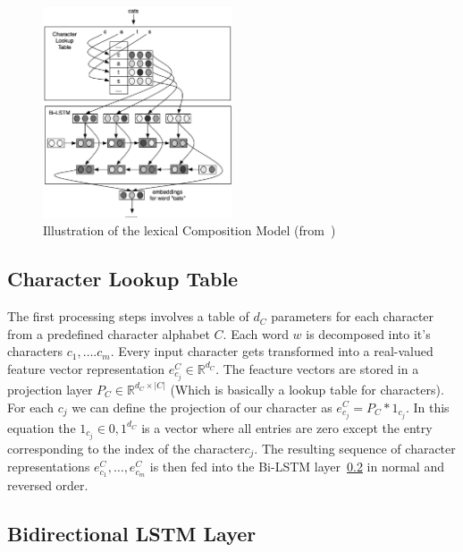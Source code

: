 \begin{figure}
  \begin{center}
    \includegraphics[width=0.5\textwidth]{./img/bi-lstm-emeddings}
  \end{center}
  \caption{Illustration of the lexical Composition Model (from~\cite{DBLP:journals/corr/LingLMAADBT15})}
\end{figure}

\subsection{Character Lookup Table}

The first processing steps involves a table of $d_C$ parameters for each character from a predefined character alphabet $C$.
Each word $w$ is decomposed into it's characters $c_1, \dots. c_m$.
Every input character gets transformed into a real-valued feature vector representation $e_{c_j}^C \in \mathbb{R}^{d_C}$.
The feacture vectors are stored in a projection layer $P_C \in \mathbb{R}^{d_C \times |C|}$ (Which is basically a lookup table for characters).
For each $c_j$ we can define the projection of our character as $e_{c_j}^C = P_C * 1_{c_j}$. In this equation the $1_{c_j} \in {0, 1}^{d_C}$ 
is a vector where all entries are zero except the entry corresponding to the index of the character$c_j$. 
The resulting sequence of character representations $e_{c_1}^C, \dots, e_{c_m}^C$ is then fed into the Bi-LSTM layer~\ref{subsec:bi-lstm}
in normal and reversed order.

\subsection{Bidirectional LSTM Layer}
\label{subsec:bi-lstm}

